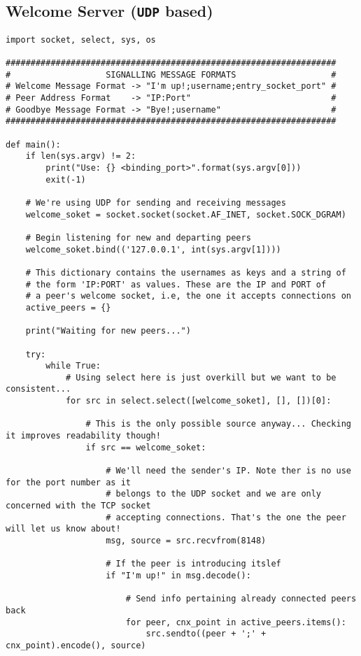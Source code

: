 \documentclass[landscape]{article}
\begin{document}
        \subsection{Welcome Server (\texttt{UDP} based)}
            \begin{verbatim}
import socket, select, sys, os

##################################################################
#                   SIGNALLING MESSAGE FORMATS                   #
# Welcome Message Format -> "I'm up!;username;entry_socket_port" #
# Peer Address Format    -> "IP:Port"                            #
# Goodbye Message Format -> "Bye!;username"                      #
##################################################################

def main():
    if len(sys.argv) != 2:
        print("Use: {} <binding_port>".format(sys.argv[0]))
        exit(-1)

    # We're using UDP for sending and receiving messages
    welcome_soket = socket.socket(socket.AF_INET, socket.SOCK_DGRAM)

    # Begin listening for new and departing peers
    welcome_soket.bind(('127.0.0.1', int(sys.argv[1])))

    # This dictionary contains the usernames as keys and a string of
    # the form 'IP:PORT' as values. These are the IP and PORT of
    # a peer's welcome socket, i.e, the one it accepts connections on
    active_peers = {}

    print("Waiting for new peers...")

    try:
        while True:
            # Using select here is just overkill but we want to be consistent...
            for src in select.select([welcome_soket], [], [])[0]:

                # This is the only possible source anyway... Checking it improves readability though!
                if src == welcome_soket:

                    # We'll need the sender's IP. Note ther is no use for the port number as it
                    # belongs to the UDP socket and we are only concerned with the TCP socket
                    # accepting connections. That's the one the peer will let us know about!
                    msg, source = src.recvfrom(8148)

                    # If the peer is introducing itslef
                    if "I'm up!" in msg.decode():

                        # Send info pertaining already connected peers back
                        for peer, cnx_point in active_peers.items():
                            src.sendto((peer + ';' + cnx_point).encode(), source)


\end{verbatim}
\end{document}

